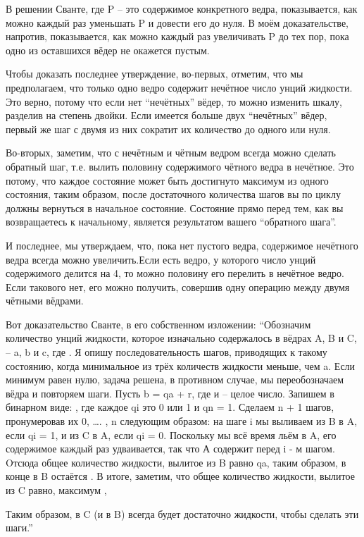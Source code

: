    В решении Сванте, где P -- это содержимое конкретного ведра, показывается, как можно  каждый раз уменьшать P и довести его до нуля. В моём доказательстве, напротив, показывается, как  можно  каждый раз увеличивать P до тех пор, пока одно из оставшихся вёдер не окажется пустым.


   Чтобы доказать последнее утверждение, во-первых, отметим, что мы предполагаем, что только одно ведро содержит нечётное число унций жидкости. Это верно, потому что если нет “нечётных” вёдер, то можно изменить шкалу, разделив на степень двойки. Если имеется больше двух “нечётных” вёдер, первый же шаг с двумя из них сократит их количество до одного или нуля. 


   Во-вторых, заметим, что с нечётным и чётным ведром всегда можно сделать обратный шаг, т.е. вылить половину содержимого чётного ведра в нечётное. Это потому, что каждое состояние может быть достигнуто максимум из одного состояния, таким образом, после достаточного количества шагов вы по циклу должны вернуться в начальное состояние.
Состояние прямо перед тем, как вы возвращаетесь к начальному, является результатом вашего “обратного шага”.


  И последнее, мы утверждаем, что, пока нет пустого ведра, содержимое нечётного ведра всегда можно увеличить.Если есть ведро, у которого число унций содержимого делится на 4, то можно половину его перелить в нечётное ведро. Если такового нет, его можно получить, совершив одну операцию между двумя чётными вёдрами.


   Вот доказательство Сванте, в его собственном изложении:
  “Обозначим количество унций жидкости, которое изначально содержалось в вёдрах A, B и C, --  a, b и c, где . Я опишу последовательность шагов, приводящих к такому состоянию, когда минимальное из трёх количеств жидкости меньше, чем a. Если минимум равен нулю, задача решена, в противном случае, мы переобозначаем вёдра и повторяем шаги.
  Пусть b = qa + r,  где    и  -- целое число. Запишем  в бинарном виде:
, где каждое qi это 0 или 1 и qn = 1.
   Сделаем n + 1 шагов, пронумеровав их  0, …. , n следующим образом: на шаге i мы выливаем из B в A, если qi = 1, и из C в A, если  qi = 0. Поскольку мы всё время льём в A, его содержимое каждый раз удваивается, так что А содержит  перед  i - м шагом.
Oтсюда общее количество жидкости, вылитое из B равно qa, таким образом, в конце в B остаётся .  В итоге, заметим, что общее количество жидкости, вылитое из C равно,  максимум
                    ,


Таким образом, в C  (и в B) всегда будет достаточно жидкости, чтобы сделать эти шаги.”


